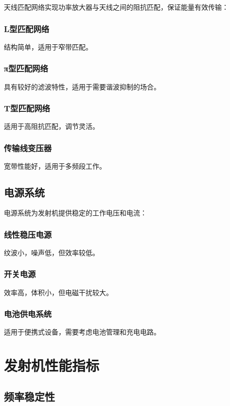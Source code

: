 \documentclass[12pt,UTF8]{ctexbook}
\begin{document}
天线匹配网络实现功率放大器与天线之间的阻抗匹配，保证能量有效传输：

\subsubsection{L型匹配网络}
结构简单，适用于窄带匹配。

\subsubsection{π型匹配网络}
具有较好的滤波特性，适用于需要谐波抑制的场合。

\subsubsection{T型匹配网络}
适用于高阻抗匹配，调节灵活。

\subsubsection{传输线变压器}
宽带性能好，适用于多频段工作。

\subsection{电源系统}

电源系统为发射机提供稳定的工作电压和电流：

\subsubsection{线性稳压电源}
纹波小，噪声低，但效率较低。

\subsubsection{开关电源}
效率高，体积小，但电磁干扰较大。

\subsubsection{电池供电系统}
适用于便携式设备，需要考虑电池管理和充电电路。

\section{发射机性能指标}

\subsection{频率稳定性}
\end{document}
